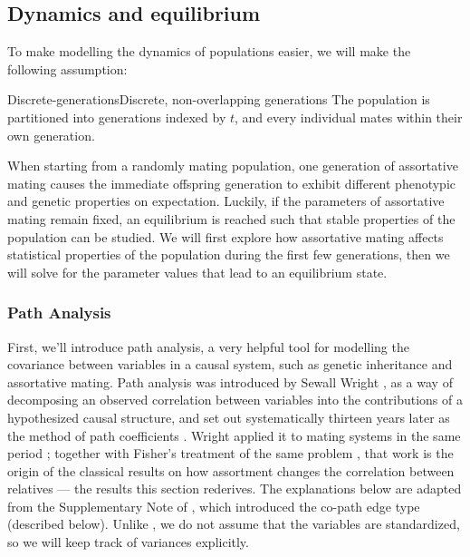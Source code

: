 \documentclass[12pt]{article}
\begin{document}
\subsection{Dynamics and equilibrium}
To make modelling the dynamics of populations easier, we will make the following assumption: 

\begin{assumption}{Discrete-generations}{Discrete, non-overlapping generations}
The population is partitioned into generations indexed by $t$, and every individual mates within their own generation.
\end{assumption}

When starting from a randomly mating population, one generation of assortative mating causes the immediate offspring generation to exhibit different phenotypic and genetic properties on expectation.
Luckily, if the parameters of assortative mating remain fixed, an equilibrium is reached such that stable properties of the population can be studied.
We will first explore how assortative mating affects statistical properties of the population during the first few generations, then we will solve for the parameter values that lead to an equilibrium state.

\subsubsection{Path Analysis}\label{sec:path-analysis}
First, we'll introduce path analysis, a very helpful tool for modelling the covariance between variables in a causal system, such as genetic inheritance and assortative mating.
Path analysis was introduced by Sewall Wright \citep{Wright1921JAgricRes}, as a way of decomposing an observed correlation between variables into the contributions of a hypothesized causal structure, and set out systematically thirteen years later as the method of path coefficients \citep{Wright1934AnnMathStat}.
Wright applied it to mating systems in the same period \citep{Wright1921GeneticsMatingI, Wright1921GeneticsMatingIII}; together with Fisher's treatment of the same problem \citep{Fisher1918TransRoySocEdin}, that work is the origin of the classical results on how assortment changes the correlation between relatives --- the results this section rederives.
The explanations below are adapted from the Supplementary Note of \citet{Sunde2025NatComm}, which introduced the co-path edge type (described below).
Unlike \citet{Sunde2025NatComm}, we do not assume that the variables are standardized, so we will keep track of variances explicitly.
\end{document}
